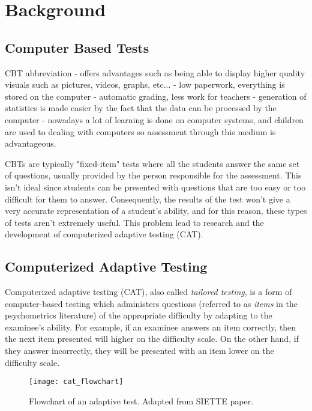 \chapter{Background}

\section{Computer Based Tests}
CBT abbreviation
- offers advantages such as being able to display higher quality visuals such as pictures, videos, graphs, etc...
- low paperwork, everything is stored on the computer
- automatic grading, less work for teachers
- generation of statistics is made easier by the fact that the data can be processed by the computer
- nowadays a lot of learning is done on computer systems, and children are used to dealing with computers so assessment through this medium is advantageous. \newline

CBTs are typically "fixed-item" tests where all the students answer the same set of questions,  usually provided by the person responsible for the assessment. This isn't ideal since students can be presented with questions that are too easy or too difficult for them to answer. Consequently, the results of the test won't give a very accurate representation of a student's ability, and for this reason, these types of tests aren't extremely useful. This problem lead to research and the development of computerized adaptive testing (CAT).

\section{Computerized Adaptive Testing}
Computerized adaptive testing (CAT), also called \textit{tailored testing}, is a form of computer-based testing which administers questions (referred to as \textit{items} in the psychometrics literature) of the appropriate difficulty by adapting to the examinee's ability.
For example, if an examinee answers an item correctly, then the next item presented will higher on the difficulty scale. On the other hand, if they answer incorrectly, they will be presented with an item lower on the difficulty scale. \newline

\begin{figure}[H]
\centering
\texttt{[image: cat\_flowchart]}
\caption{Flowchart of an adaptive test. Adapted from SIETTE paper.}
\label{fig:cat_flowchart}
\end{figure}

